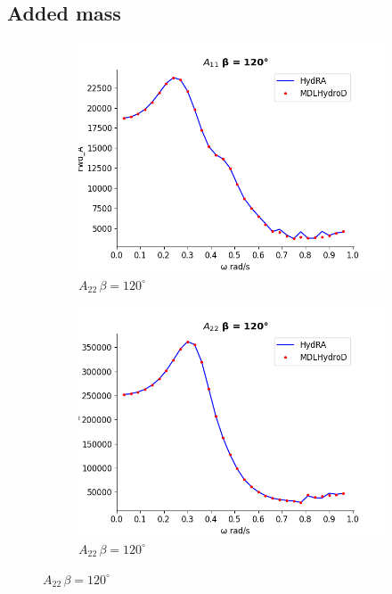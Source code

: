 \subsection{Added mass}
\begin{figure}[H]
    \centering
    \begin{subfigure}[b]{0.49\textwidth}
        \includegraphics[width=\textwidth]{plots/kvlcc/added_mass/a11.png}
        \caption{$A_{22} \, \beta = 120^{\circ}$}
    \end{subfigure}
    \begin{subfigure}[b]{0.49\textwidth}
        \includegraphics[width=\textwidth]{plots/kvlcc/added_mass/a22.png}
        \caption{$A_{22} \, \beta = 120^{\circ}$}
    \end{subfigure}

\end{figure}
